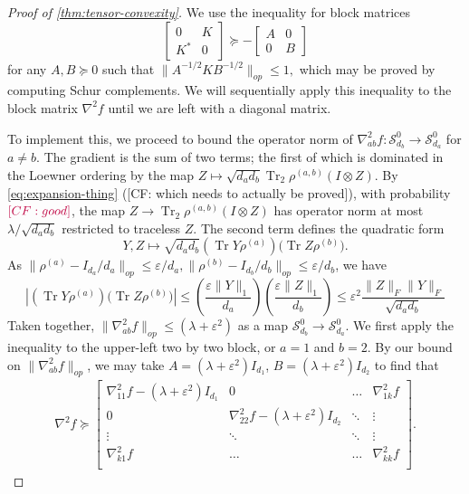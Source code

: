 \documentclass{article}
\newcommand{\ot}{\otimes}
\newcommand\eps{\varepsilon}
\newcommand\Sym{\mathcal{S}}
\newcommand\tr{\operatorname{Tr}}
\newcommand{\CF}[1]{{\color{purple}[CF: #1]}}
\begin{document}
\begin{proof}[Proof of \cref{thm:tensor-convexity}] 
We use the inequality for block matrices 
$$\begin{bmatrix} 0 & K \\ K^{*} & 0 \end{bmatrix} \succeq - \begin{bmatrix} A & 0 \\ 0 & B \end{bmatrix}$$ for any $A,B \succeq 0$ such that $\|A^{-1/2} K B^{-1/2}\|_{op} \leq 1,$ which may be proved by computing Schur complements. We will sequentially apply this inequality to the block matrix $\nabla^2 f$ until we are left with a diagonal matrix. 

To implement this, we proceed to bound the operator norm of $\nabla^2_{ab} f: \Sym^0_{d_b} \to \Sym^0_{d_a}$ for $a \neq b$. The gradient is the sum of two terms; the first of which is dominated in the Loewner ordering by the map $Z \mapsto \sqrt{d_a d_b} \tr_2 \rho^{(a,b)} (I \ot Z)$. By \cref{eq:expansion-thing} (\CF{which needs to actually be proved}), with probability $\CF{good}$, the map $Z \to \tr_2 \rho^{(a,b)} (I \ot Z)$ has operator norm at most $\lambda/\sqrt{d_a d_b}$ restricted to traceless $Z$. The second term defines the quadratic form 
$$Y,Z \mapsto \sqrt{d_a d_b} (\tr Y \rho^{(a)})\bigl(\tr Z \rho^{(b)}\bigr).$$ As $\|\rho^{(a)} - I_{d_a}/{d_a}\|_{op} \leq \eps/d_a, \|\rho^{(b)} - I_{d_b}/d_b\|_{op} \leq \eps/d_b$, we have
$$ |(\tr Y \rho^{(a)})\bigl(\tr Z \rho^{(b)}\bigr)| \leq \left( \frac{\eps \|Y\|_{1}}{d_{a}} \right) \left( \frac{\eps \|Z\|_{1}}{d_{b}} \right) \leq \eps^2 \frac{\|Z\|_F\|Y\|_F}{\sqrt{d_a d_b}} $$
Taken together, $\|\nabla^2_{ab} f\|_{op} \leq (\lambda + \eps^2)$ as a map $\Sym^0_{d_b} \to \Sym^0_{d_a}$. We first apply the inequality to the upper-left two by two block, or $a = 1$ and $b = 2$. By our bound on $\|\nabla^2_{ab} f\|_{op}$, we may take 
   $A = (\lambda + \eps^2) I_{d_1}$, $B = (\lambda + \eps^2)I_{d_2}$ to find that 
   \begin{align*}
\nabla^2 f \succeq \begin{bmatrix}
 \nabla^2_{11} f - (\lambda + \eps^2) I_{d_1} & 0 & \hdots &  \nabla^2_{1k} f \\
0 & \nabla^2_{22} f - (\lambda + \eps^2) I_{d_2} & \ddots & \vdots \\
\vdots & \ddots & \ddots & \vdots\\
\nabla^2_{k1}f & \hdots &  \hdots & \nabla^2_{kk} f \\
  \end{bmatrix}.\end{align*}

\end{proof}
\end{document}
